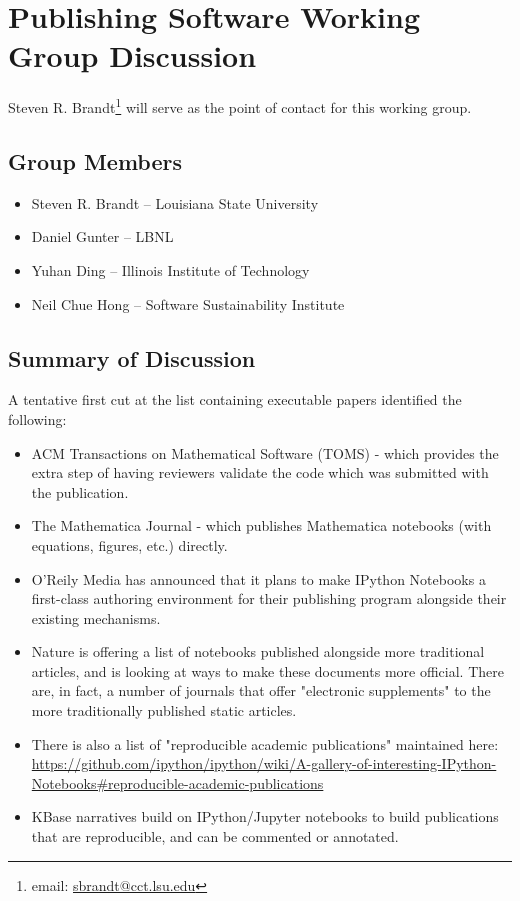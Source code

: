 \section{Publishing Software Working Group Discussion}
\label{sec:appendix_publishing_SW}

Steven R. Brandt\footnote{email: \href{mailto:sbrandt@cct.lsu.edu}{sbrandt@cct.lsu.edu}} will serve as the point of contact for this working group.

\subsection{Group Members}

\begin{itemize}
\item Steven R. Brandt -- Louisiana State University
\item Daniel Gunter -- LBNL
\item Yuhan Ding -- Illinois Institute of Technology
\item Neil Chue Hong -- Software Sustainability Institute
\end{itemize}

\subsection{Summary of Discussion}

A tentative first cut at the list containing executable papers identified the following:

\begin{itemize}
\item ACM Transactions on Mathematical Software (TOMS) - which provides the extra step
 of having reviewers validate the code which was submitted with the publication.
\item The Mathematica Journal - which publishes Mathematica notebooks (with equations,
figures, etc.) directly.
\item O'Reily Media has announced that it plans to make IPython Notebooks a first-class
 authoring environment for their publishing program alongside their existing mechanisms.
\item Nature is offering a list of notebooks published alongside more traditional articles,
 and is looking at ways to make these documents more official. There are, in fact, a
 number of journals that offer "electronic supplements" to the more traditionally published
 static articles.
\item There is also a list of "reproducible academic publications" maintained here:
  \url{https://github.com/ipython/ipython/wiki/A-gallery-of-interesting-IPython-Notebooks#reproducible-academic-publications}
\item KBase narratives build on IPython/Jupyter notebooks to build publications that are
  reproducible, and can be commented or annotated.
\end{itemize}

